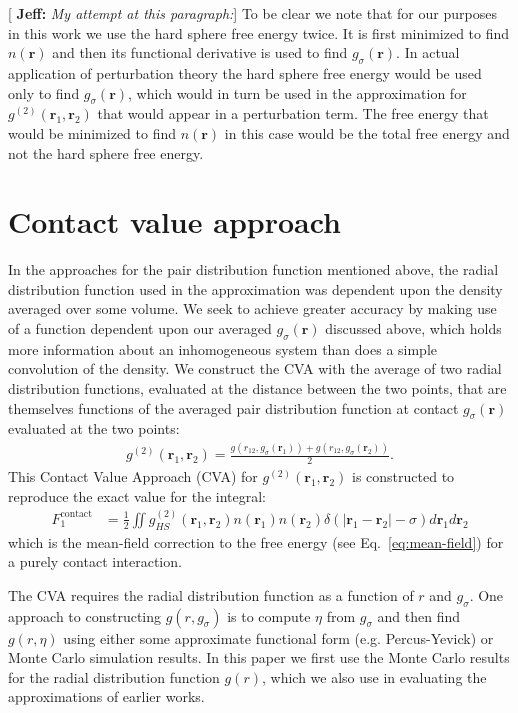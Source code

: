 \documentclass[letterpaper,twocolumn,amsmath,amssymb,pre,aps,10pt]{revtex4-1}
\newcommand{\cyan}[1]{{\bf \color{cyan} #1}}
\newcommand{\rr}{\textbf{r}}
\newcommand{\jeffsays}[1]{{\color{red} [\cyan{Jeff:} \emph{#1}]}}
\begin{document}
\jeffsays{My attempt at this paragraph:} To be clear we note that for
our purposes in this work we use the hard sphere free energy twice.
It is first minimized to find $n(\rr)$ and then its functional
derivative is used to find $g_\sigma(\rr)$.  In actual application of
perturbation theory the hard sphere free energy would be used only to
find $g_\sigma(\rr)$, which would in turn be used in the approximation
for $g^{(2)}(\rr_1,\rr_2)$ that would appear in a perturbation term.
The free energy that would be minimized to find $n(\rr)$ in this case
would be the total free energy and not the hard sphere free energy.

\section{Contact value approach}
In the approaches for the pair distribution function mentioned above,
the radial distribution function used in the approximation
was dependent upon the density averaged over some volume.  We seek to
achieve greater accuracy by making use of a function dependent upon
our averaged $g_{\sigma}(\rr)$ discussed above, which holds more
information about an inhomogeneous system than does a simple
convolution of the density.
%
We construct the CVA with the average of two radial distribution
functions, evaluated at the distance between the two points, that are
themselves functions of the averaged pair distribution function at contact
$g_{\sigma}(\rr)$ evaluated at the two points:
%
\begin{align}
  g^{(2)}(\rr_1,\rr_2) = \frac{g(r_{12}, g_\sigma(\rr_1)) +
    g(r_{12}, g_\sigma(\rr_2))}{2}. \label{eq:g2-our-mean}
\end{align}
This Contact Value Approach (CVA) for $g^{(2)}(\rr_1,\rr_2)$ is
constructed to reproduce the exact value for the integral:
\begin{align}
  F_1^{\text{contact}} &= \tfrac12 \iint
  g^{(2)}_{HS}(\rr_1,\rr_2)n(\rr_1)n(\rr_2)\delta(|\rr_1-\rr_2|-\sigma)
  d\rr_1d\rr_2
  \label{eq:mean-field-contact}
\end{align}
which is the mean-field correction to the free energy (see
Eq.~\ref{eq:mean-field}) for a purely contact interaction.

The CVA requires the radial distribution function as a function of $r$
and $g_\sigma$.  One approach to constructing $g(r,g_\sigma)$ is to
compute $\eta$ from $g_\sigma$ and then find $g(r,\eta)$ using either
some approximate functional form (e.g. Percus-Yevick) or Monte Carlo
simulation results.  In this paper we first use the Monte Carlo
results for the radial distribution function $g(r)$, which we also use
in evaluating the approximations of earlier works.
\end{document}
